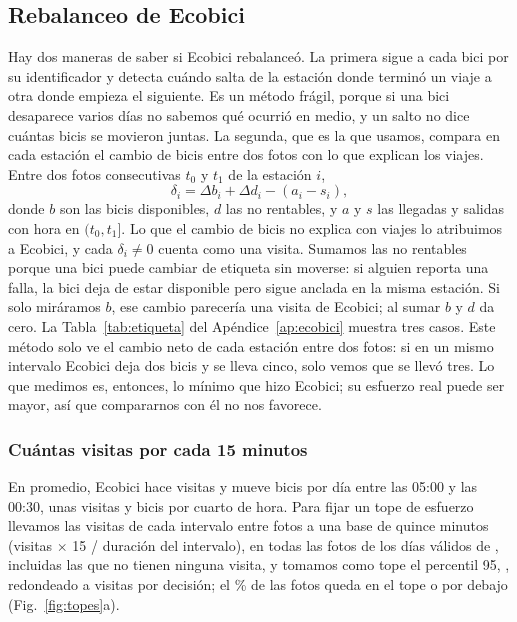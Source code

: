 \documentclass[conference,letterpaper,10pt]{IEEEtran}
\begin{document}
\subsection{Rebalanceo de Ecobici}\label{sec:medicion}
Hay dos maneras de saber si Ecobici rebalanceó. La primera sigue a cada bici por su identificador y detecta cuándo salta de la estación donde terminó un viaje a otra donde empieza el siguiente. Es un método frágil, porque si una bici desaparece varios días no sabemos qué ocurrió en medio, y un salto no dice cuántas bicis se movieron juntas. La segunda, que es la que usamos, compara en cada estación el cambio de bicis entre dos fotos con lo que explican los viajes. Entre dos fotos consecutivas $t_0$ y $t_1$ de la estación $i$,
\begin{equation}\label{eq:delta}
\delta_i=\Delta b_i+\Delta d_i-(a_i-s_i),
\end{equation}
donde $b$ son las bicis disponibles, $d$ las no rentables, y $a$ y $s$ las llegadas y salidas con hora en $(t_0,t_1]$. Lo que el cambio de bicis no explica con viajes lo atribuimos a Ecobici, y cada $\delta_i\neq0$ cuenta como una visita. Sumamos las no rentables porque una bici puede cambiar de etiqueta sin moverse: si alguien reporta una falla, la bici deja de estar disponible pero sigue anclada en la misma estación. Si solo miráramos $b$, ese cambio parecería una visita de Ecobici; al sumar $b$ y $d$ da cero. La Tabla~\ref{tab:etiqueta} del Apéndice~\ref{ap:ecobici} muestra tres casos. Este método solo ve el cambio neto de cada estación entre dos fotos: si en un mismo intervalo Ecobici deja dos bicis y se lleva cinco, solo vemos que se llevó tres. Lo que medimos es, entonces, lo mínimo que hizo Ecobici; su esfuerzo real puede ser mayor, así que compararnos con él no nos favorece.

\subsubsection{Cuántas visitas por cada 15 minutos}
En promedio, Ecobici hace \recoVis{} visitas y mueve \recoBicis{} bicis por día entre las 05:00 y las 00:30, unas \chVisQuince{} visitas y \chPorQuince{} bicis por cuarto de hora. Para fijar un tope de esfuerzo llevamos las visitas de cada intervalo entre fotos a una base de quince minutos (visitas $\times$ 15 / duración del intervalo), en todas las fotos de los \ctopeDias{} días válidos de \ctopePeriodo, incluidas las que no tienen ninguna visita, y tomamos como tope el percentil 95, \cfigVisPNoventaCinco, redondeado a \ctopeVis{} visitas por decisión; el \cfigVisBajoTope\% de las fotos queda en el tope o por debajo (Fig.~\ref{fig:topes}a).
\end{document}
